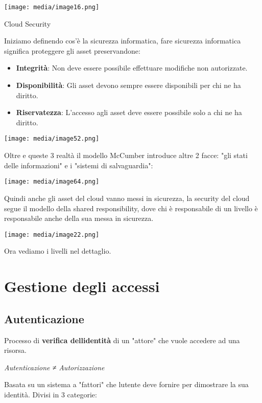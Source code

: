 \texttt{[image: media/image16.png]}

Cloud Security

Iniziamo definendo cos'è la sicurezza informatica, fare sicurezza
informatica significa proteggere gli asset preservandone:

\begin{itemize}
\item
  \textbf{Integrità}: Non deve essere possibile effettuare modifiche non
  autorizzate.
\item
  \textbf{Disponibilità}: Gli asset devono sempre essere disponibili per
  chi ne ha diritto.
\item
  \textbf{Riservatezza}: L'accesso agli asset deve essere possibile solo
  a chi ne ha diritto.
\end{itemize}

\texttt{[image: media/image52.png]}

Oltre e queste 3 realtà il modello McCumber introduce altre 2 facce:
"gli stati delle informazioni" e i "sistemi di salvaguardia":

\texttt{[image: media/image64.png]}

Quindi anche gli asset del cloud vanno messi in sicurezza, la security
del cloud segue il modello della shared responsibility, dove chi è
responsabile di un livello è responsabile anche della sua messa in
sicurezza.

\texttt{[image: media/image22.png]}

Ora vediamo i livelli nel dettaglio.

\section{Gestione degli accessi}\label{gestione-degli-accessi}

\subsection{Autenticazione}\label{autenticazione}

Processo di \textbf{verifica dell\textquotesingle identità} di un
"attore" che vuole accedere ad una risorsa.

\emph{Autenticazione ≠ Autorizzazione}

Basata su un sistema a "fattori" che l\textquotesingle utente deve
fornire per dimostrare la sua identità. Divisi in 3 categorie:

